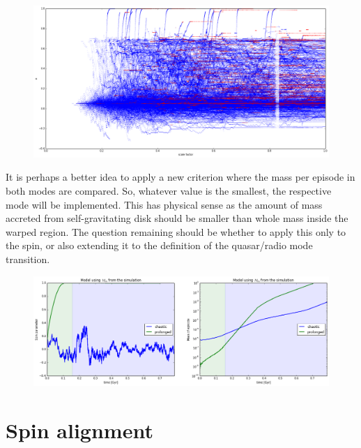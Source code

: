 \documentclass[a4,useAMS,usenatbib,usegraphicx,12pt]{article}
\begin{document}
\begin{figure}[htbp]
\centering
\includegraphics[width=1.0\textwidth]{./figures/SpinEvolutionCosmo.png}
\end{figure}


It is perhaps a better idea to apply a new criterion where the mass per episode in both modes are compared. So, 
whatever value is the smallest, the respective mode will be implemented. This has physical sense as the amount
of mass accreted from self-gravitating disk should be smaller than whole mass inside the warped region. The 
question remaining should be whether to apply this only to the spin, or also extending it to the definition of
the quasar/radio mode transition.


\begin{figure}[htbp]
\centering
\includegraphics[width=1.0\textwidth]{./figures/TransitionMode.png}
\end{figure}


\section{Spin alignment}
\end{document}
